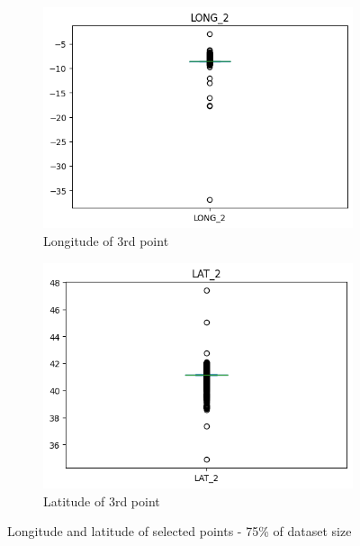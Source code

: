 \documentclass[12pt, titlepage]{article}
\begin{document}
\begin{figure}[H]
\begin{subfigure}[t]{.49\textwidth}
        \includegraphics[width =\textwidth]{image/long2_train.png}
        \caption{Longitude of 3rd point}
        \label{fig:long_lat}
    \end{subfigure}
    \hfill
    \begin{subfigure}[t]{.49\textwidth}
        \includegraphics[width =\textwidth]{image/lat2_train.png}
        \caption{Latitude of 3rd point}
        \label{fig:long_lat}
    \end{subfigure}
    \caption{Longitude and latitude of selected points - 75\% of dataset size}
    \label{fig:long_lat}
\end{figure}
\end{document}
